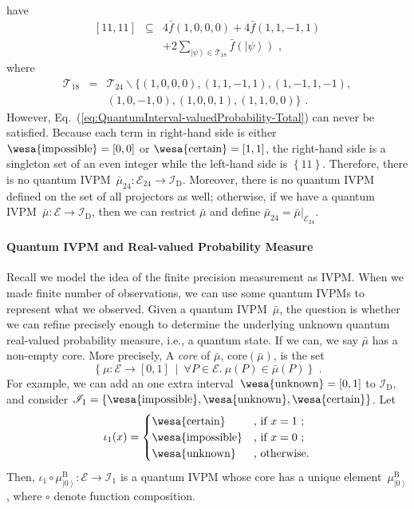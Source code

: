 \documentclass[english,reprint, aps, prl,superscriptaddress, showpacs,
showkeys, longbibliography]{revtex4-1}
\theoremstyle{plain}
\theoremstyle{definition}
\newcommand{\events}{\ensuremath{\mathcal{E}}}
\newcommand{\pmeas}{\ensuremath{\mu}}
\newcommand{\imposs}{{\mbox{\wesa{impossible}}}}
\newcommand{\necess}{{\mbox{\wesa{certain}}}}
\newcommand{\unknown}{{\mbox{\wesa{unknown}}}}
\newcommand{\ket}[1]{{\left\vert{#1}\right\rangle}}
\newcommand{\set}[2]{\ensuremath{\left\{ {#1}~\middle|~{#2}\right\} }}
\begin{document}
have
\begin{eqnarray}
\left[11,11\right] & \subseteq & 4\bar{f}(1,0,0,0)+4\bar{f}(1,1,-1,1)\nonumber \\
 &  & +2\sum_{\ket{\psi}\in\mathcal{T}_{18}}\bar{f}\left(\ket{\psi}\right)\textrm{ ,}\label{eq:QuantumInterval-valuedProbability-Total}
\end{eqnarray}
where 
\begin{eqnarray}
\mathcal{T}_{18} & = & \mathcal{T}_{24}\backslash\{(1,0,0,0),(1,1,-1,1),(1,-1,1,-1),\nonumber \\
 &  & (1,0,-1,0),(1,0,0,1),(1,1,0,0)\}\textrm{ .}
\end{eqnarray}
However, Eq.~(\ref{eq:QuantumInterval-valuedProbability-Total})
can never be satisfied. Because each term in right-hand side is either
$\imposs=\left[0,0\right]$ or $\necess=\left[1,1\right]$, the right-hand
side is a singleton set of an even integer while the left-hand side
is $\left\{ 11\right\} $. Therefore, there is no quantum IVPM~$\bar{\mu}_{24}:\events_{24}\rightarrow\mathscr{I}_{\mathrm{D}}$.
Moreover, there is no quantum IVPM defined on the set of all projectors
as well; otherwise, if we have a quantum IVPM~$\bar{\mu}:\events\rightarrow\mathscr{I}_{\mathrm{D}}$,
then we can restrict $\bar{\mu}$ and define $\bar{\mu}_{24}=\left.\bar{\mu}\right|_{\events_{24}}$.

\paragraph{Quantum IVPM and Real-valued Probability Measure}

Recall we model the idea of the finite precision measurement as IVPM.
When we made finite number of observations, we can use some quantum
IVPMs to represent what we observed. Given a quantum IVPM~$\bar{\mu}$,
the question is whether we can refine precisely enough to determine
the underlying unknown quantum real-valued probability measure, i.e.,
a quantum state. If we can, we say $\bar{\mu}$ has a non-empty core.
More precisely, A \emph{core} of $\bar{\mu}$, $\mathrm{core}\left(\bar{\mu}\right)$,
is the set 
\begin{equation}
\set{\pmeas:\events\rightarrow[0,1]}{\forall P\in\events.~\pmeas\left(P\right)\in\bar{\mu}\left(P\right)}\textrm{ .}
\end{equation}
For example, we can add an one extra interval~$\unknown=\left[0,1\right]$
to $\mathscr{I}_{\mathrm{D}}$, and consider $\mathscr{I}_{1}=\left\{ \imposs,\unknown,\necess\right\} $.
Let 
\begin{equation}
\iota_{1}(x)=\begin{cases}
\necess & \text{, if }x=1\text{ ;}\\
\imposs & \text{, if }x=0\text{ ;}\\
\unknown & \text{, otherwise.}
\end{cases}\label{eq:homomorphism-1}
\end{equation}
Then, $\iota_{1}\circ\mu_{\ket{0}}^{\mathrm{B}}:\events\rightarrow\mathscr{I}_{1}$
is a quantum IVPM whose core has a unique element~$\mu_{\ket{0}}^{\mathrm{B}}$,
where $\circ$ denote function composition.
\end{document}
